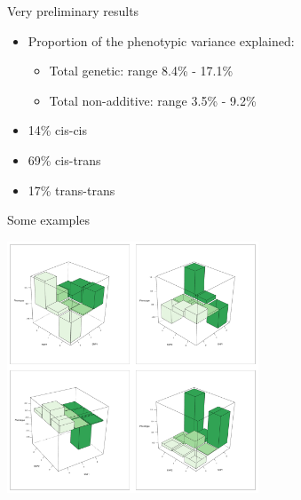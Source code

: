 \documentclass{beamer}
\begin{document}
\begin{frame}{Very preliminary results}
\begin{itemize}
\item Proportion of the phenotypic variance explained:
\begin{itemize}
\item Total genetic: range 8.4\% - 17.1\%
\item Total non-additive: range 3.5\% - 9.2\%
\end{itemize}
\item 14\% cis-cis
\item 69\% cis-trans
\item 17\% trans-trans
\end{itemize}
\end{frame}

\begin{frame}{Some examples}
\begin{center}
\includegraphics[height=7.5cm]{epistasis_examples}
\end{center}
\end{frame}


\section*{}
\end{document}
